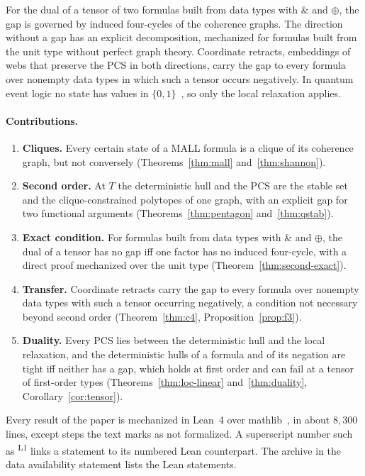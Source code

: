 For the dual of a tensor of two formulas built from data types with
$\mathbin{\&}$ and $\oplus$, the gap is governed by induced four-cycles of
the coherence graphs. The direction without a gap has an explicit
decomposition, mechanized for formulas built from the unit type without
perfect graph theory. Coordinate retracts, embeddings of webs that
preserve the PCS in both directions, carry the gap to every
formula over nonempty data types in which such a tensor occurs
negatively. In quantum event logic no state has values in
$\{0,1\}$~\cite{kochen-specker1967}, so only the local relaxation
applies.

\paragraph{Contributions.}
\begin{enumerate}
  \item \textbf{Cliques.} Every certain state of a MALL formula is a clique
  of its coherence graph, but not conversely (Theorems~\ref{thm:mall}
  and~\ref{thm:shannon}).
  \item \textbf{Second order.} At $T$ the deterministic hull and the
  PCS are the stable set and the clique-constrained polytopes
  of one graph, with an explicit gap for two functional arguments
  (Theorems~\ref{thm:pentagon} and~\ref{thm:qstab}).
  \item \textbf{Exact condition.} For formulas built from data types with
  $\mathbin{\&}$ and $\oplus$, the dual of a tensor has no gap iff one
  factor has no induced four-cycle, with a direct proof mechanized over the
  unit type (Theorem~\ref{thm:second-exact}).
  \item \textbf{Transfer.} Coordinate retracts carry the gap to every
  formula over nonempty data types with such a tensor occurring negatively,
  a condition not necessary beyond second order (Theorem~\ref{thm:c4},
  Proposition~\ref{prop:f3}).
  \item \textbf{Duality.} Every PCS lies between the deterministic hull
  and the local relaxation, and the deterministic hulls of a formula and
  of its negation are tight iff neither has a gap, which holds at first
  order and can fail at a tensor of first-order types
  (Theorems~\ref{thm:loc-linear} and~\ref{thm:duality},
  Corollary~\ref{cor:tensor}).
\end{enumerate}

Every result of the paper is mechanized in Lean~4 over
\textsf{mathlib}~\cite{moura-ullrich2021,mathlib2020}, in about
$8{,}300$ lines, except steps the text marks as not formalized. A superscript number such as
\textsuperscript{\textsf{\scriptsize L1}} links a statement to its numbered
Lean counterpart. The archive in the data availability statement lists
the Lean statements.
